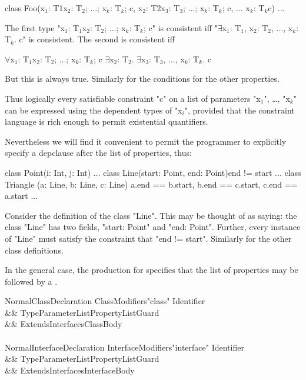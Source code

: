 \begin{xtenmath}
class Foo(x$_1$: T1{x$_2$: T$_2$; $\dots$; x$_k$: T$_k$; c},
          x$_2$: T2{x$_3$: T$_3$; $\dots$; x$_k$: T$_k$; c},
          $\dots$
          x$_k$: T$_k${c}) {
  $\dots$
}
\end{xtenmath}

The first type \xcdmath"x$_1$: T$_1${x$_2$: T$_2$; $\dots$; x$_k$: T$_k$; c}" is consistent iff
\xcdmath"$\exists$x$_1$: T$_1$, x$_2$: T$_2$, $\dots$, x$_k$: T$_k$. c" is consistent. The second is
consistent iff
\begin{xtenmath}
$\forall$x$_1$: T$_1${x$_2$: T$_2$; $\dots$; x$_k$: T$_k$; c}
$\exists$x$_2$: T$_2$. $\exists$x$_3$: T$_3$, $\dots$, x$_k$: T$_k$. c
\end{xtenmath}
\noindent But this is always true. Similarly for the conditions for the other
properties.

Thus logically every satisfiable constraint \xcd"c" on a list of parameters
\xcdmath"x$_1$", \dots, \xcdmath"x$_k$"
can be expressed using the dependent types of 
\xcdmath"x$_i$", provided
that the constraint language is rich enough to permit existential
quantifiers.

Nevertheless we will find it convenient to permit the programmer to
explicitly specify a depclause after the list of properties, thus:
\begin{xten}
class Point(i: Int, j: Int) { ... }
class Line(start: Point, end: Point){end != start} { ... }
class Triangle (a: Line, b: Line, c: Line)
   {a.end == b.start,  b.end == c.start,
    c.end == a.start} { ... }
\end{xten}

Consider the definition of the class \xcd"Line". This may be thought of as
saying: the class \xcd"Line" has two fields, \xcd"start: Point" and
\xcd"end: Point".
Further, every instance of \xcd"Line" must satisfy the constraint that
\xcd"end != start". Similarly for the other class definitions. 

In the general case, the production for 
specifies that the list of properties may be followed by a
.

\begin{grammar}
NormalClassDeclaration \:
      ClassModifiers\opt \xcd"class" Identifier  \\
   && TypeParameterList\opt PropertyList\opt Guard\opt \\
   && Extends\opt Interfaces\opt ClassBody \\
\\
NormalInterfaceDeclaration \:
      InterfaceModifiers\opt \xcd"interface" Identifier  \\
   && TypeParameterList\opt PropertyList\opt Guard\opt \\
   && ExtendsInterfaces\opt InterfaceBody \\
\end{grammar}

